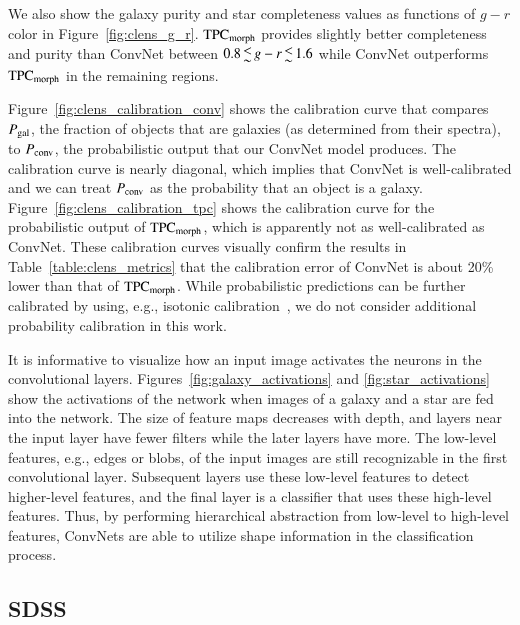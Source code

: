 \documentclass[fleqn,usenatbib]{mnras}
\newcommand{\eg}{{e.g., }}
\begin{document}
We also show the galaxy purity and star completeness values as functions of
$g-r$ color in Figure~\ref{fig:clens_g_r}.
${\mathrm{TPC}}_{{\mathrm{morph}}}$ provides slightly better
completeness and purity than ConvNet between $0.8 \la g-r \la 1.6$ while
ConvNet outperforms ${\mathrm{TPC}}_{{\mathrm{morph}}}$ in the remaining regions.

Figure~\ref{fig:clens_calibration_conv} shows the calibration curve
that compares $P_{{\mathrm{gal}}}$,
the fraction of objects that are galaxies (as determined from their spectra),
to $P_{{\mathrm{conv}}}$, the probabilistic output that our ConvNet model produces.
The calibration curve is nearly diagonal, which implies that ConvNet
is well-calibrated and we can treat $P_{{\mathrm{conv}}}$ as the probability
that an object is a galaxy.
Figure~\ref{fig:clens_calibration_tpc} shows the calibration curve
for the probabilistic output of ${\mathrm{TPC}}_{{\mathrm{morph}}}$,
which is apparently not as well-calibrated as ConvNet.
These calibration curves visually confirm the results in
Table~\ref{table:clens_metrics} that the calibration error
of ConvNet is about 20\% lower than that of ${\mathrm{TPC}}_{{\mathrm{morph}}}$.
While probabilistic predictions can be further calibrated by using,
\eg isotonic calibration~\citep{zadrozny2001obtaining},
we do not consider additional probability calibration in this work.

It is informative to visualize how an input image activates the neurons
in the convolutional layers.
Figures~\ref{fig:galaxy_activations} and \ref{fig:star_activations}
show the activations of the network when images of a galaxy and a star
are fed into the network.
The size of feature maps decreases with depth, and layers near the
input layer have fewer filters while the later layers have more.
The low-level features, \eg edges or blobs, of the input images are still
recognizable in the first convolutional layer.
Subsequent layers use these low-level features to detect higher-level features,
and the final layer is a classifier that uses these high-level features.
Thus, by performing hierarchical abstraction from low-level to high-level
features, ConvNets are able to utilize shape information in the classification
process.


\subsection{SDSS}
  \label{sec:results_sdss}
\end{document}
